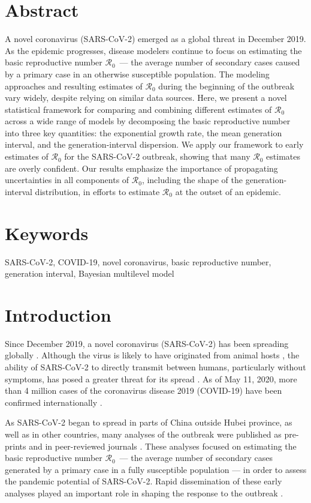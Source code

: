 \documentclass[12pt]{article}
\newcommand{\Ro}{\ensuremath{{\mathcal R}_{0}}\xspace}
\begin{document}
\section*{Abstract}
A novel coronavirus (SARS-CoV-2) emerged as a global threat in December 2019. 
As the epidemic progresses, disease modelers continue to focus on estimating the basic reproductive number \Ro\ --- the average number of secondary cases caused by a primary case in an otherwise susceptible population.
The modeling approaches and resulting estimates of \Ro during the beginning of the outbreak vary widely, despite relying on similar data sources.
Here, we present a novel statistical framework for comparing and combining different estimates of \Ro across a wide range of models by decomposing the basic reproductive number into three key quantities: the exponential growth rate, the mean generation interval, and the generation-interval dispersion.
We apply our framework to early estimates of \Ro for the SARS-CoV-2 outbreak, showing that many \Ro estimates are overly confident.
Our results emphasize the importance of propagating uncertainties in all components of \Ro, including the shape of the generation-interval distribution, in efforts to estimate \Ro at the outset of an epidemic.

\section*{Keywords}

SARS-CoV-2, COVID-19, novel coronavirus, basic reproductive number, generation interval, Bayesian multilevel model

\section{Introduction}

Since December 2019, a novel coronavirus (SARS-CoV-2) has been spreading globally \citep{pneumonia}.
Although the virus is likely to have originated from animal hosts \citep{andersen2020proximal}, the ability of SARS-CoV-2 to directly transmit between humans, particularly without symptoms, has posed a greater threat for its spread \citep{he2020temporal}.
As of May 11, 2020, more than 4 million cases of the coronavirus disease 2019 (COVID-19) have been confirmed internationally \citep{who112}.

As SARS-CoV-2 began to spread in parts of China outside Hubei province, as well as in other countries, many analyses of the outbreak were published as pre-prints \citep{bedfordncov, imaincov, liuncov, majumderncov, readncov, zhaoncov} and in peer-reviewed journals \citep{li2020early, riou2020pattern, wu2020nowcasting, zhao2020preliminary}.
These analyses focused on estimating the basic reproductive number \Ro\ --- the average number of secondary cases generated by a primary case in a fully susceptible population \citep{anderson1991infectious, diekmann1990definition} --- in order to assess the pandemic potential of SARS-CoV-2.
Rapid dissemination of these early analyses played an important role in shaping the response to the outbreak \citep{majumder2020early}.
\end{document}
